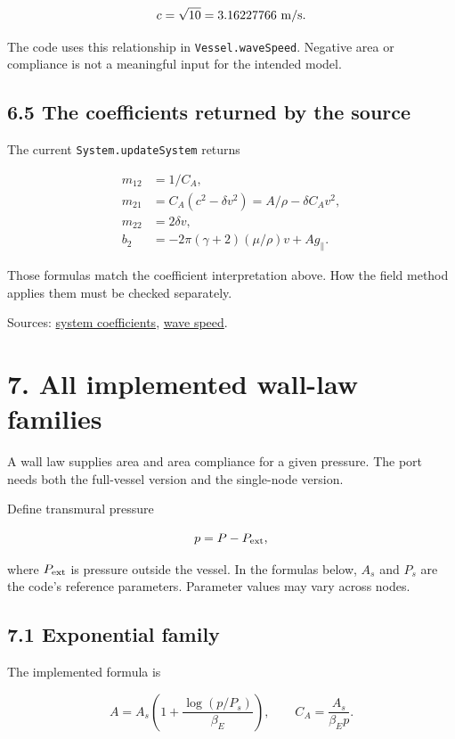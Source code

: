 \documentclass[11pt,a4paper]{article}
\begin{document}
\begingroup\small
\[
c=\sqrt{10}=3.16227766\ {\rm m/s}.
\]
\endgroup


The code uses this relationship in \texttt{Vessel.\allowbreak{}waveSpeed}. Negative area or compliance is not a meaningful input for the intended model.

\subsection{6.5 The coefficients returned by the source}
The current \texttt{System.\allowbreak{}updateSystem} returns


\begingroup\small
\[
\begin{aligned}
m_{12}&=1/C_A,\\
m_{21}&=C_A(c^2-\delta v^2)
      =A/\rho-\delta C_Av^2,\\
m_{22}&=2\delta v,\\
b_2&=-2\pi(\gamma+2)(\mu/\rho)v+A g_\parallel.
\end{aligned}
\]
\endgroup


Those formulas match the coefficient interpretation above. How the field method applies them must be checked separately.

Sources: \href{/home/sadid/starfish/SolverLib/classSystemEquations.py}{system coefficients}, \href{/home/sadid/starfish/NetworkLib/classVessel.py}{wave speed}.

\clearpage
\section{7. All implemented wall-law families}
A wall law supplies area and area compliance for a given pressure. The port needs both the full-vessel version and the single-node version.

Define transmural pressure


\begingroup\small
\[
p=P-P_{\rm ext},
\]
\endgroup


where \(P_{\rm ext}\) is pressure outside the vessel. In the formulas below, \(A_s\) and \(P_s\) are the code's reference parameters. Parameter values may vary across nodes.

\subsection{7.1 Exponential family}
The implemented formula is


\begingroup\small
\[
A=A_s\left(1+\frac{\log(p/P_s)}{\beta_E}\right),
\qquad
C_A=\frac{A_s}{\beta_Ep}.
\]
\endgroup
\end{document}
